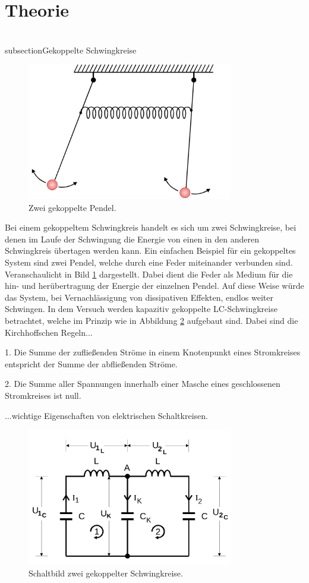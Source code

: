 \section{Theorie}
\label{sec:Theorie}

\\subsection{Gekoppelte Schwingkreise} %
\label{sub:Gekoppelte Schwingkreise}


\begin{figure}
\label{fig:bild1}
    \centering
    \includegraphics[height=6.0cm]{data/Bild1.png}
    \caption{Zwei gekoppelte Pendel.}
\end{figure}

Bei einem gekoppeltem Schwingkreis handelt es sich um zwei Schwingkreise, bei denen im Laufe der Schwingung
die Energie von einen in den anderen Schwingkreis übertagen werden kann. Ein einfachen Beispiel für ein gekoppeltes
System sind zwei Pendel, welche durch eine Feder miteinander verbunden sind. Veranschaulicht in Bild \ref{fig:bild1} dargestellt. Dabei dient die Feder als Medium für die hin- und herübertragung der Energie der einzelnen Pendel.
Auf diese Weise würde das System, bei Vernachlässigung von dissipativen Effekten, endlos weiter Schwingen.
In dem Versuch werden kapazitiv gekoppelte LC-Schwingkreise betrachtet, welche im Prinzip wie in Abbildung \ref{fig:bild2}
aufgebaut sind. Dabei sind die Kirchhoffschen Regeln...

1.  Die Summe der zufließenden Ströme in einem Knotenpunkt eines Stromkreises entspricht
    der Summe der abfließenden Ströme.

2.  Die Summe aller Spannungen innerhalb einer Masche eines geschlossenen Stromkreises
    ist null.

...wichtige Eigenschaften von elektrischen Schaltkreisen.

\begin{figure}
\label{fig:bild2}
    \centering
    \includegraphics[height=6.0cm]{data/Bild2.png}
    \caption{Schaltbild zwei gekoppelter Schwingkreise.}
\end{figure}


